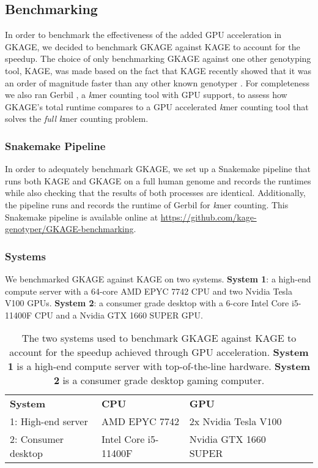 \subsection{Benchmarking} \label{results:benchmarking}
In order to benchmark the effectiveness of the added GPU acceleration in GKAGE, we decided to benchmark GKAGE against KAGE to account for the speedup.
The choice of only benchmarking GKAGE against one other genotyping tool, KAGE, was made based on the fact that KAGE recently showed that it was an order of magnitude faster than any other known genotyper \cite{kage}.
For completeness we also ran Gerbil \cite{gerbil}, a \textit{k}mer counting tool with GPU support, to assess how GKAGE's total runtime compares to a GPU accelerated \textit{k}mer counting tool that solves the \textit{full} \textit{k}mer counting problem.

\subsubsection{Snakemake Pipeline}
In order to adequately benchmark GKAGE, we set up a Snakemake pipeline that runs both KAGE and GKAGE on a full human genome and records the runtimes while also checking that the results of both processes are identical.
Additionally, the pipeline runs and records the runtime of Gerbil for \textit{k}mer counting.
This Snakemake pipeline is available online at \url{https://github.com/kage-genotyper/GKAGE-benchmarking}.

\subsubsection{Systems}
We benchmarked GKAGE against KAGE on two systems.
\textbf{System 1}: a high-end compute server with a 64-core AMD EPYC 7742 CPU and two Nvidia Tesla V100 GPUs.
\textbf{System 2}: a consumer grade desktop with a 6-core Intel Core i5-11400F CPU and a Nvidia GTX 1660 SUPER GPU.

\vspace{1em}
\begin{table}[H]
\begin{center}
\begin{tabular}{lllll}
\multicolumn{1}{l|}{\textbf{System}} & \multicolumn{1}{l}{\textbf{CPU}}                  & \multicolumn{1}{l}{\textbf{GPU}}                   &  \\ \cline{1-3}
\multicolumn{1}{l|}{1: High-end server} & \multicolumn{1}{l}{AMD EPYC 7742}        & \multicolumn{1}{l}{2x Nvidia Tesla V100}     &  \\ 
\multicolumn{1}{l|}{2: Consumer desktop} & \multicolumn{1}{l}{Intel Core i5-11400F} & \multicolumn{1}{l}{Nvidia GTX 1660 SUPER} &  \\
\end{tabular}
\end{center}
\caption{
  The two systems used to benchmark GKAGE against KAGE to account for the speedup achieved through GPU acceleration.
  \textbf{System 1} is a high-end compute server with top-of-the-line hardware.
  \textbf{System 2} is a consumer grade desktop gaming computer.
}
\label{results:gkage:tables:systems}
\end{table}

